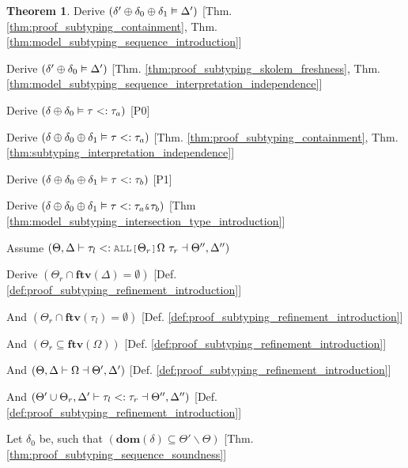 \documentclass[acmsmall]{acmart}
\theoremstyle{definition}
\newtheorem{theorem}{Theorem}[section]
\begin{document}
\begin{theorem}
  \item \I\I \N Derive $(
    \delta' \oplus \delta_0 \oplus \delta_1 \vDash \Delta'
  )$ [Thm. \ref{thm:proof_subtyping_containment}, Thm. \ref{thm:model_subtyping_sequence_introduction}]
  \item \I\I \N Derive $(
    \delta' \oplus \delta_0 \vDash \Delta'
  )$ [Thm. \ref{thm:proof_subtyping_skolem_freshness}, Thm. \ref{thm:model_subtyping_sequence_interpretation_independence}]
  \item \I\I \N Derive $(
    \delta \oplus \delta_0 \vDash \tau <: \tau_a
  )$ [P0]

  \item \I\I \N Derive $(
    \delta \oplus \delta_0 \oplus \delta_1 \vDash \tau <: \tau_a
  )$ [Thm. \ref{thm:proof_subtyping_containment}, Thm. \ref{thm:subtyping_interpretation_independence}]

  \item \I\I \N Derive $(
    \delta \oplus \delta_0 \oplus \delta_1 \vDash \tau <: \tau_b
  )$ [P1]

  \item \I\I \N Derive $(
    \delta \oplus \delta_0 \oplus \delta_1 \satisfies \tau \subtypes \tau_a \J{\&} \tau_b
  )$ [Thm \ref{thm:model_subtyping_intersection_type_introduction}]


  \item \N Assume $(
    \Theta, \Delta \entails \tau_l \subtypes \J{ALL[}\Theta_r\J{]}\Omega\ \tau_r \given \Theta'', \Delta''
  )$
  \item \I \N Derive $(
    \Theta_r \cap \textbf{ftv}(\Delta) = \emptyset
  )$ [Def. \ref{def:proof_subtyping_refinement_introduction}]
  \item \I \N And $(
    \Theta_r \cap \textbf{ftv}(\tau_l) = \emptyset
  )$ [Def. \ref{def:proof_subtyping_refinement_introduction}]
  \item \I \N And $(
    \Theta_r \subseteq \textbf{ftv}(\Omega)
  )$ [Def. \ref{def:proof_subtyping_refinement_introduction}]
  \item \I \N And $(
    \Theta, \Delta \vdash \Omega \dashv \Theta', \Delta'
  )$ [Def. \ref{def:proof_subtyping_refinement_introduction}]
  \item \I \N And $(
    \Theta' \cup \Theta_r, \Delta' \vdash
    \tau_l <: \tau_r \dashv \Theta'', \Delta''
  )$ [Def. \ref{def:proof_subtyping_refinement_introduction}]

  \item \I \N Let $\delta_0$ be, such that $(
    \textbf{dom}(\delta) \subseteq \Theta' \backslash \Theta
  )$ [Thm. \ref{thm:proof_subtyping_sequence_soundness}]


\end{theorem}
\end{document}
